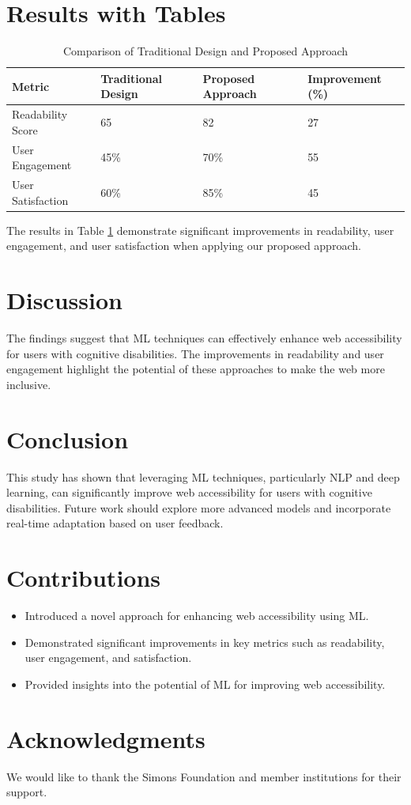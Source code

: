 \documentclass{article}
\begin{document}
\section{Results with Tables}
\begin{table}[ht]
\centering
\begin{tabular}{@{}llll@{}}
\toprule
\textbf{Metric} & \textbf{Traditional Design} & \textbf{Proposed Approach} & \textbf{Improvement (\%)} \\ \midrule
Readability Score & 65 & 82 & 27 \\
User Engagement & 45\% & 70\% & 55 \\
User Satisfaction & 60\% & 85\% & 45 \\ \bottomrule
\end{tabular}
\caption{Comparison of Traditional Design and Proposed Approach}
\label{tab:results}
\end{table}

The results in Table \ref{tab:results} demonstrate significant improvements in readability, user engagement, and user satisfaction when applying our proposed approach.

\section{Discussion}
The findings suggest that ML techniques can effectively enhance web accessibility for users with cognitive disabilities. The improvements in readability and user engagement highlight the potential of these approaches to make the web more inclusive.

\section{Conclusion}
This study has shown that leveraging ML techniques, particularly NLP and deep learning, can significantly improve web accessibility for users with cognitive disabilities. Future work should explore more advanced models and incorporate real-time adaptation based on user feedback.

\section{Contributions}
\begin{itemize}
    \item Introduced a novel approach for enhancing web accessibility using ML.
    \item Demonstrated significant improvements in key metrics such as readability, user engagement, and satisfaction.
    \item Provided insights into the potential of ML for improving web accessibility.
\end{itemize}

\section*{Acknowledgments}
We would like to thank the Simons Foundation and member institutions for their support.



\end{document}
